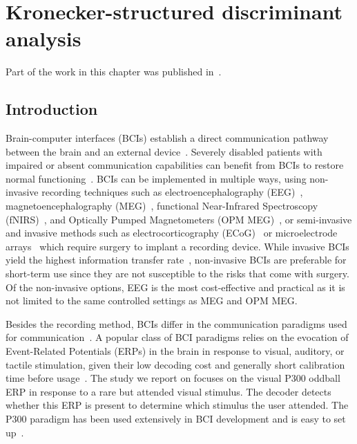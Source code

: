 \chapter{Kronecker-structured discriminant analysis}


Part of the work in this chapter was published in~\cite{VanDenKerchove2022}.

\section{Introduction}

Brain-computer interfaces (BCIs) establish a direct communication pathway
between the brain and an external device~\cite{Wolpaw2002}.
Severely disabled patients with impaired or absent communication capabilities
can benefit from BCIs to restore normal functioning~\cite{Naci2012,Chaudhary2016}.
BCIs can be implemented in multiple ways, using non-invasive recording
techniques such as electroencephalography (EEG)~\cite{Abiri2019},
magnetoencephalography (MEG)~\cite{Mellinger2007},
functional Near-Infrared Spectroscopy (fNIRS)~\cite{Hong2015}, and Optically Pumped
Magnetometers (OPM MEG)~\cite{Paek2020}, or semi-invasive and invasive methods such as
electrocorticography (ECoG)~\cite{Schalk2011} or microelectrode
arrays~\cite{Maynard1997} which require surgery to implant a recording device.
While invasive BCIs yield the highest information transfer
rate~\cite{Willett2021}, non-invasive BCIs are preferable for short-term use
since they are not susceptible to the risks that come with surgery.
Of the non-invasive options, EEG is the most cost-effective and practical as it
is not limited to the same controlled settings as MEG and OPM MEG.

Besides the recording method, BCIs differ in the communication paradigms used
for communication~\cite{Abiri2019}.
A popular class of BCI paradigms relies on the evocation
of Event-Related Potentials (ERPs) in the brain in response to visual, auditory, or tactile stimulation, given their low decoding cost and generally short
calibration time before usage~\cite{Gao2014, Kapgate2015}.
The study we report on focuses on the visual P300 oddball ERP in response to a
rare but attended visual stimulus.
The decoder detects whether this ERP is present to determine which stimulus
the user attended.
The P300 paradigm has been used extensively in BCI development and is easy to
set up~\cite{Farwell1988, Sellers2006, Barachant2014, Philip2020}.

